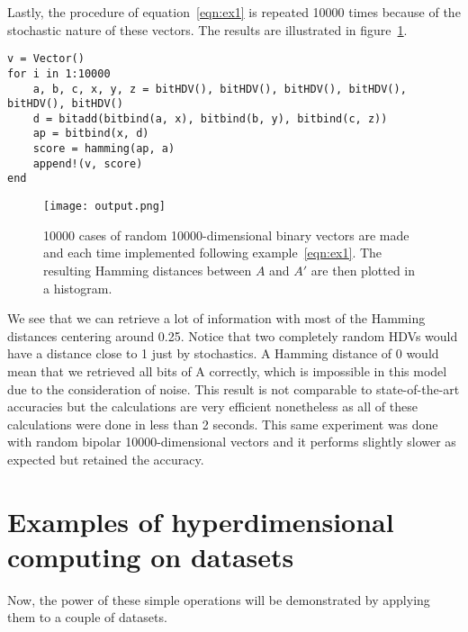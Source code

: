 Lastly, the procedure of equation~\ref{eqn:ex1} is repeated 10000 times because of the stochastic nature of these vectors. The results are illustrated in figure~\ref{fig:exm1}.
\begin{verbatim}
v = Vector()
for i in 1:10000
    a, b, c, x, y, z = bitHDV(), bitHDV(), bitHDV(), bitHDV(), bitHDV(), bitHDV()
    d = bitadd(bitbind(a, x), bitbind(b, y), bitbind(c, z))
    ap = bitbind(x, d)
    score = hamming(ap, a)
    append!(v, score)
end
\end{verbatim}
\begin{figure}[h]
    \centering
    \texttt{[image: output.png]}
    \caption{10000 cases of random 10000-dimensional binary vectors are made and each time implemented following example~\ref{eqn:ex1}. The resulting Hamming distances between $A$ and $A'$ are then plotted in a histogram.}
    \label{fig:exm1}
\end{figure}
We see that we can retrieve a lot of information with most of the Hamming distances centering around 0.25. Notice that two completely random HDVs would have a distance close to 1 just by stochastics. A Hamming distance of 0 would mean that we retrieved all bits of A correctly, which is impossible in this model due to the consideration of noise. This result is not comparable to state-of-the-art accuracies but the calculations are very efficient nonetheless as all of these calculations were done in less than 2 seconds. This same experiment was done with random bipolar 10000-dimensional vectors and it performs slightly slower as expected but retained the accuracy.
\section{Examples of hyperdimensional computing on datasets}
Now, the power of these simple operations will be demonstrated by applying them to a couple of datasets.

